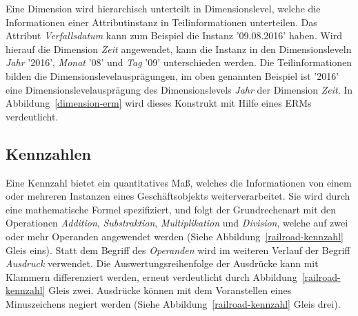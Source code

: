 \documentclass[
  language=german, %
  type=bachelor%
]{isthesis}
\begin{document}
\begin{content}
  \begin{figure}[caption={Teilsprache---Dimension}, label={dimension-erm}]
    \resizebox{350px}{!}{}
  \end{figure}
  
  Eine Dimension wird hierarchisch unterteilt in Dimensionslevel, welche die
  Informationen einer Attributinstanz in Teilinformationen unterteilen. Das
  Attribut \textit{Verfallsdatum} kann zum Beispiel die Instanz '09.08.2016'
  haben. Wird hierauf die Dimension \textit{Zeit} angewendet, kann die Instanz
  in den Dimensionsleveln \textit{Jahr} '2016', \textit{Monat} '08' und
  \textit{Tag} '09' unterschieden werden. Die Teilinformationen bilden die
  Dimensionslevelausprägungen, im oben genannten Beispiel ist '2016' eine
  Dimensionslevelausprägung des Dimensionslevels \textit{Jahr} der Dimension
  \textit{Zeit}. In Abbildung~\ref{dimension-erm} wird dieses Konstrukt mit
  Hilfe eines \acrshort{ERM}s verdeutlicht.
  
  \subsection{Kennzahlen}

  \begin{figure}[caption={Teilsprache---Kennzahl}, label={kennzahl}]
    \resizebox{250px}{!}{}
  \end{figure}

  Eine Kennzahl bietet ein quantitatives  Maß,
  welches die Informationen von einem oder mehreren Instanzen eines
  Geschäftsobjekts weiterverarbeitet. Sie wird durch eine mathematische Formel
  spezifiziert, und folgt der Grundrechenart mit den Operationen
  \textit{Addition}, \textit{Substraktion}, \textit{Multiplikation} und
  \textit{Division}, welche auf zwei oder mehr Operanden angewendet werden
  (Siehe Abbildung~\ref{railroad-kennzahl} Gleis eins).  Statt dem Begriff des
  \textit{Operanden} wird im weiteren Verlauf der Begriff \textit{Ausdruck}
  verwendet.  Die Auswertungsreihenfolge der Ausdrücke kann mit Klammern
  differenziert werden, erneut verdeutlicht durch
  Abbildung~\ref{railroad-kennzahl} Gleis zwei. Ausdrücke können mit dem
  Voranstellen eines Minuszeichens negiert werden (Siehe
  Abbildung~\ref{railroad-kennzahl} Gleis drei).


\end{content}
\end{document}
